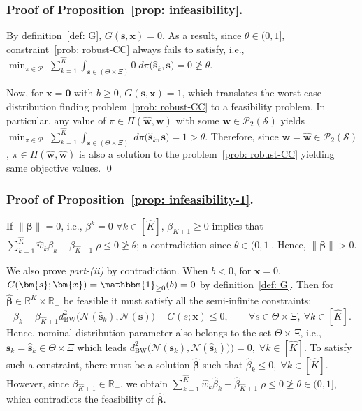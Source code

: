 \documentclass[opre,sglanonrev]{informs4}
\newcommand{\mS}{\mathcal{S}}
\newcommand{\mN}{\mathcal{N}}
\newcommand{\mP}{\mathcal{P}}
\newcommand{\mbR}{\mathbb R}
\newcommand{\hbs}{\hat{\bs}}
\newcommand{\bbeta}{\bm{\beta}}
\newcommand{\bzero}{\bm{0}}
\newcommand{\bs}{\bm{s}}
\newcommand{\bw}{\bm{w}}
\newcommand{\bx}{\bm{x}}
\begin{document}
{\begin{APPENDICES}
\subsubsection{Proof of Proposition~\ref{prop: infeasibility}. }
    By definition~\eqref{def: G}, $G(\bs, \bx) = 0$. As a result, since $\theta \in (0, 1]$, constraint~\eqref{prob: robust-CC} always fails to satisfy, i.e.,  
    $\min_{\pi \in \mP} \;\sum_{k=1}^{\hat{K}} \int_{\bs \in (\Theta \times \Xi)} 0 \; d\pi \bigl(\hat{\bs}_k, \bs\bigr) = 0 \ngeq \theta$.
    
    Now, for $\bx = \bzero$ with $b \geq 0$, $G(\bs, \bx) = 1$, which translates the worst-case distribution finding problem~\eqref{prob: robust-CC} to a feasibility problem. In particular, any value of $\pi \in \Pi(\hat{\bw}, \bw)$ with some $\bw \in \mathcal P_2(\mS)$  yields $\min_{\pi \in \mP} \;\sum_{k=1}^{\hat{K}} \int_{\bs \in (\Theta \times \Xi)} \; d\pi \bigl(\hat{\bs}_k, \bs\bigr) = 1 > \theta$. Therefore, since $\bw = \hat{\bw} \in \mathcal P_2(\mS)$, $\pi \in \Pi(\hat{\bw}, \hat{\bw})$ is also a solution to the problem~\eqref{prob: robust-CC} yielding same objective values. \hfill \qed

\subsubsection{Proof of Proposition~\ref{prop: infeasibility-1}. }
    If $\|\bbeta\| = 0$, i.e., $\beta^k = 0 \,\, \forall k \in [\hat{K}]$, $\beta_{K+1} \geq 0$ implies that $\sum_{k=1}^{\hat{K}} \hat{w}_k \beta_k - \beta_{\hat{K}+1} \; \rho \leq 0 \ngeq \theta$; a contradiction since $\theta \in (0, 1]$. Hence, $\|\bbeta\| > 0$. 
    
    We also prove \emph{part-(ii)} by contradiction. When $b <0$, for $\bx = 0$, $G(\bs; \bx) = \mathbbm{1}_{\geq 0}(b) = 0$ by definition~\eqref{def: G}. Then for $\hat{\bbeta}\in\mbR^{\hat{K}}\times\mathbb R_+$ be feasible it must satisfy all the semi-infinite constraints:
\[
\beta_k-\beta_{\hat{K}+1}d^2_{\mathrm{BW}}\bigl(\mN(\hbs_k),\mN(\bs)\bigr) - G(s;\bx) \leq 0,
\qquad \forall s\in\Theta\times\Xi,\ \forall k\in[\hat{K}].
\]
Hence, nominal distribution parameter also belongs to the set $\Theta \times \Xi$, i.e., $\bs_k=\hat{\bs}_k \in \Theta \times \Xi$ which leads $d^2_{\mathrm{BW}}\big( \mN(\bs_k), \mN(\hat{\bs}_k)) \big) = 0, \; \forall k \in [\hat{K}]$. To satisfy such a constraint, there must be a solution $\hat{\bbeta}$ such that  $\hat{\beta}_k \leq 0, \; \forall k \in [\hat{K}]$. However, since $\beta_{\hat{K}+1} \in \mbR_+$, we obtain $\sum_{k=1}^{\hat{K}} \hat{w}_k \hat{\beta}_k - \hat{\beta}_{\hat{K}+1} \; \rho \leq 0 \ngeq \theta \in (0, 1]$, which contradicts the feasibility of $\hat{\bbeta}$. 


\end{APPENDICES}}
\end{document}
